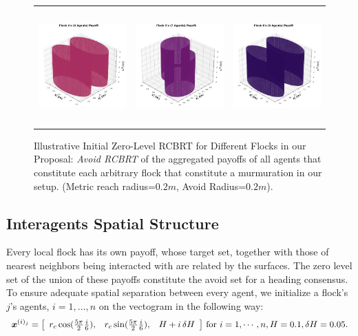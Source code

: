 \begin{figure}[tb!]
\begin{tabular}{ccc}
		\includegraphics[height=12em,width=10em]{figures/flock_4.jpg}
		&
		\includegraphics[height=12em,width=10em]{figures/flock_5.jpg} 
		&
		\includegraphics[height=12em,width=10em]{figures/flock_6.jpg}
	\end{tabular}
	\caption{\footnotesize Illustrative Initial Zero-Level RCBRT for Different Flocks in our Proposal: \textit{Avoid RCBRT} of the aggregated payoffs of all  agents that constitute each arbitrary flock that constitute a murmuration in our setup.  (Metric reach radius=$0.2m$, Avoid Radius=$0.2m$).} 
	\label{fig:flocks_multi}
\end{figure}

\subsection{Interagents Spatial Structure}

Every local flock has its own payoff, whose target set, together with those of nearest neighbors being interacted with are related by the surfaces. The zero level set of the union of these payoffs constitute the avoid set for a heading consensus. To ensure adequate spatial separation between every agent, we initialize a flock's $j$'s agents, $i=1,\ldots, n$ on the vectogram in the following way:
%
\begin{align}
	\bm{x}^{(i)_j} = \left[\begin{array}{ccc}
		r_c \cos (\frac{5\pi}{2}\frac{i}{6}), & 	r_c \sin (\frac{5\pi}{2}\frac{i}{6}), & H+i\,\delta H
	\end{array}\right] \, \text{for } i=1, \cdots, n, H=0.1, \delta H = 0.05.
\end{align}
